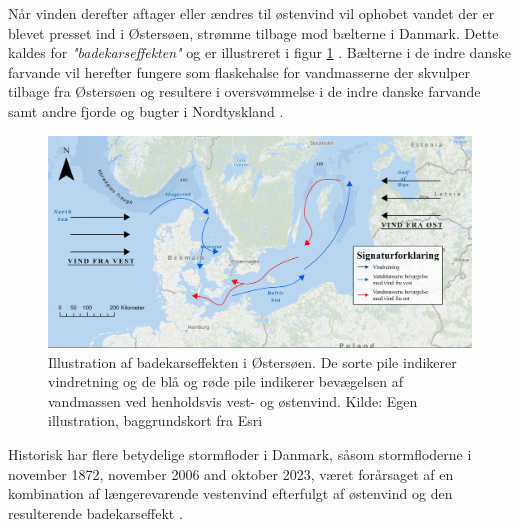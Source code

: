 Når vinden derefter aftager eller ændres til østenvind vil ophobet vandet der er blevet presset ind i Østersøen, strømme tilbage mod bælterne i Danmark. Dette kaldes for \textit{"badekarseffekten"} og er illustreret i figur \ref{Figur: Bathtub effect} \citep{kystdirektoratet_stormfloder, egusphere_baltic}. Bælterne i de indre danske farvande vil herefter fungere som flaskehalse for vandmasserne der skvulper tilbage fra Østersøen og resultere i oversvømmelse i de indre danske farvande samt andre fjorde og bugter i Nordtyskland \citep{egusphere_baltic}.
\begin{figure}[H]
    \centering
    \includegraphics[width=0.8\linewidth]{images/teori/bathtub effect graphics.jpg}
    \caption{Illustration af badekarseffekten i Østersøen. De sorte pile indikerer vindretning og de blå og røde pile indikerer bevægelsen af vandmassen ved henholdsvis vest- og østenvind. Kilde: Egen illustration, baggrundskort fra Esri}
    \label{Figur: Bathtub effect}
\end{figure}

Historisk har flere betydelige stormfloder i Danmark, såsom stormfloderne i november 1872, november 2006 and oktober 2023, været forårsaget af en kombination af længerevarende vestenvind efterfulgt af østenvind og den resulterende badekarseffekt \citep{kystdirektoratet_stormfloder}.

